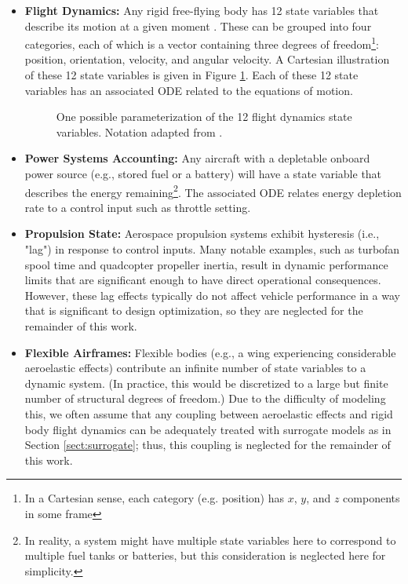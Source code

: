 \begin{itemize}
    \item \textbf{Flight Dynamics:} Any rigid free-flying body has 12 state variables that describe its motion at a given moment \cite{fva}. These can be grouped into four categories, each of which is a vector containing three degrees of freedom\footnote{In a Cartesian sense, each category (e.g. position) has $x$, $y$, and $z$ components in some frame}: position, orientation, velocity, and angular velocity. A Cartesian illustration of these 12 state variables is given in Figure \ref{fig:flight-dynamics-vars}. Each of these 12 state variables has an associated ODE related to the equations of motion.
    \begin{figure}
        \centering
        
        \caption{One possible parameterization of the 12 flight dynamics state variables. Notation adapted from \cite{fva}.}
        \label{fig:flight-dynamics-vars}
    \end{figure}

    \item \textbf{Power Systems Accounting:} Any aircraft with a depletable onboard power source (e.g., stored fuel or a battery) will have a state variable that describes the energy remaining\footnote{In reality, a system might have multiple state variables here to correspond to multiple fuel tanks or batteries, but this consideration is neglected here for simplicity.}. The associated ODE relates energy depletion rate to a control input such as throttle setting.
    \item \textbf{Propulsion State:} Aerospace propulsion systems exhibit hysteresis (i.e., "lag") in response to control inputs. Many notable examples, such as turbofan spool time and quadcopter propeller inertia, result in dynamic performance limits that are significant enough to have direct operational consequences. However, these lag effects typically do not affect vehicle performance in a way that is significant to design optimization, so they are neglected for the remainder of this work. %
    \item \textbf{Flexible Airframes:} Flexible bodies (e.g., a wing experiencing considerable aeroelastic effects) contribute an infinite number of state variables to a dynamic system. (In practice, this would be discretized to a large but finite number of structural degrees of freedom.) Due to the difficulty of modeling this, we often assume that any coupling between aeroelastic effects and rigid body flight dynamics can be adequately treated with surrogate models as in Section \ref{sect:surrogate}; thus, this coupling is neglected for the remainder of this work.
\end{itemize}

